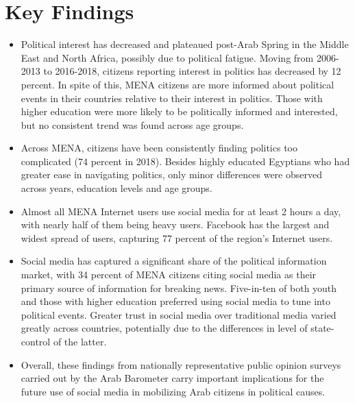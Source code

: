 \documentclass[12pt]{article}
\begin{document}
\section*{Key Findings}
\begin{itemize}
  \item Political interest has decreased and plateaued post-Arab Spring in the Middle East and North Africa, possibly due to political fatigue. Moving from 2006-2013 to 2016-2018, citizens reporting interest in politics has decreased by 12 percent. In spite of this, MENA citizens are more informed about political events in their countries relative to their interest in politics. Those with higher education were more likely to be politically informed and interested, but no consistent trend was found across age groups.
  \item Across MENA, citizens have been consistently finding politics too complicated (74 percent in 2018). Besides highly educated Egyptians who had greater ease in navigating politics, only minor differences were observed across years, education levels and age groups.
  \item Almost all MENA Internet users use social media for at least 2 hours a day, with nearly half of them being heavy users. Facebook has the largest and widest spread of users, capturing 77 percent of the region's Internet users.
  \item Social media has captured a significant share of the political information market, with 34 percent of MENA citizens citing social media as their primary source of information for breaking news. Five-in-ten of both youth and those with higher education preferred using social media to tune into political events. Greater trust in social media over traditional media varied greatly across countries, potentially due to the differences in level of state-control of the latter.
  \item Overall, these findings from nationally representative public opinion surveys carried out by the Arab Barometer carry important implications for the future use of social media in mobilizing Arab citizens in political causes.

\end{itemize}

\pagebreak
\end{document}
